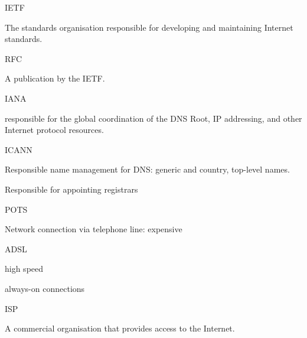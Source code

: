 \documentclass[main.tex]{subfiles}
\begin{document}
\small

\layer{}

\begin{card}{IETF}
\item The standards organisation responsible for developing and maintaining Internet standards.
\end{card}

\begin{card}{RFC}
\item A publication by the IETF.
\end{card}

\begin{card}{IANA}
\item responsible for the global coordination of the DNS Root, IP addressing, and other Internet protocol resources.
\end{card}

\begin{card}{ICANN}
\item Responsible name management for DNS: generic and country, top-level names.
\item Responsible for appointing registrars
\end{card}

\begin{card}{POTS}
\item Network connection via telephone line: expensive
\end{card}

\begin{card}{ADSL}
\item high speed
\item always-on connections
\end{card}

\begin{card}{ISP}
\item A commercial organisation that provides access to the Internet.
\end{card}
\end{document}
